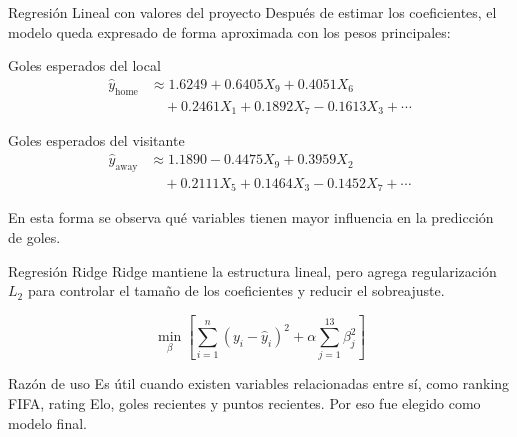 \documentclass[aspectratio=169]{beamer}
\begin{document}
\begin{frame}[t]{Regresión Lineal con valores del proyecto}
\scriptsize
\justifying
Después de estimar los coeficientes, el modelo queda expresado de forma aproximada con los pesos principales:

\vspace{0.1cm}
\begin{block}{Goles esperados del local}
\[
\begin{aligned}
\hat{y}_{\text{home}}
&\approx
1.6249+0.6405X_9+0.4051X_6\\
&\quad +0.2461X_1+0.1892X_7-0.1613X_3+\cdots
\end{aligned}
\]
\end{block}

\begin{block}{Goles esperados del visitante}
\[
\begin{aligned}
\hat{y}_{\text{away}}
&\approx
1.1890-0.4475X_9+0.3959X_2\\
&\quad +0.2111X_5+0.1464X_3-0.1452X_7+\cdots
\end{aligned}
\]
\end{block}

\vspace{0.1cm}
En esta forma se observa qué variables tienen mayor influencia en la predicción de goles.
\end{frame}

\begin{frame}{Regresión Ridge}
\justifying
Ridge mantiene la estructura lineal, pero agrega regularización $L_2$ para controlar el tamaño de los coeficientes y reducir el sobreajuste.

\[
\min_{\beta}
\left[
\sum_{i=1}^{n}(y_i-\hat{y}_i)^2
+
\alpha\sum_{j=1}^{13}\beta_j^2
\right]
\]

\vspace{0.25cm}
\begin{block}{Razón de uso}
Es útil cuando existen variables relacionadas entre sí, como ranking FIFA, rating Elo, goles recientes y puntos recientes. Por eso fue elegido como modelo final.
\end{block}
\end{frame}
\end{document}
